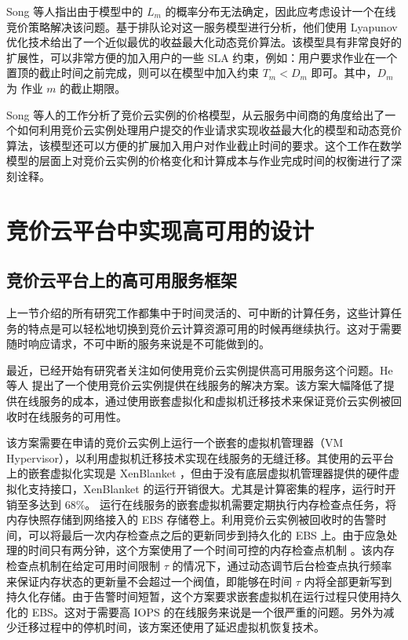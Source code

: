 Song 等人指出由于模型中的 $L_m$ 的概率分布无法确定，因此应考虑设计一个在线竞价策略解决该问题。基于排队论对这一服务模型进行分析，他们使用 Lyapunov 优化技术给出了一个近似最优的收益最大化动态竞价算法。该模型具有非常良好的扩展性，可以非常方便的加入用户的一些 SLA 约束，例如：用户要求作业在一个置顶的截止时间之前完成，则可以在模型中加入约束 $T_m < D_m$ 即可。其中，$D_m$ 为 作业 $m$ 的截止期限。

Song 等人的工作分析了竞价云实例的价格模型，从云服务中间商的角度给出了一个如何利用竞价云实例处理用户提交的作业请求实现收益最大化的模型和动态竞价算法，该模型还可以方便的扩展加入用户对作业截止时间的要求。这个工作在数学模型的层面上对竞价云实例的价格变化和计算成本与作业完成时间的权衡进行了深刻诠释。

\section{竞价云平台中实现高可用的设计}
\subsection{竞价云平台上的高可用服务框架}
上一节介绍的所有研究工作都集中于时间灵活的、可中断的计算任务，这些计算任务的特点是可以轻松地切换到竞价云计算资源可用的时候再继续执行。这对于需要随时响应请求，不可中断的服务来说是不可能做到的。

最近，已经开始有研究者关注如何使用竞价云实例提供高可用服务这个问题。He 等人 \cite{He:2015:CCH:2749246.2749275}  提出了一个使用竞价云实例提供在线服务的解决方案。该方案大幅降低了提供在线服务的成本，通过使用嵌套虚拟化和虚拟机迁移技术来保证竞价云实例被回收时在线服务的可用性。

该方案需要在申请的竞价云实例上运行一个嵌套的虚拟机管理器（VM Hypervisor），以利用虚拟机迁移技术实现在线服务的无缝迁移。其使用的云平台上的嵌套虚拟化实现是 XenBlanket \cite{Williams:2012:XVO:2168836.2168849}，但由于没有底层虚拟机管理器提供的硬件虚拟化支持接口，XenBlanket 的运行开销很大。尤其是计算密集的程序，运行时开销至多达到 68\%。 运行在线服务的嵌套虚拟机需要定期执行内存检查点任务，将内存快照存储到网络接入的 EBS 存储卷上。利用竞价云实例被回收时的告警时间，可以将最后一次内存检查点之后的更新同步到持久化的 EBS 上。由于应急处理的时间只有两分钟，这个方案使用了一个时间可控的内存检查点机制 \cite{Singh:2013:YEG:2482626.2482642}。该内存检查点机制在给定可用时间限制 $\tau$ 的情况下，通过动态调节后台检查点执行频率来保证内存状态的更新量不会超过一个阀值，即能够在时间 $\tau$ 内将全部更新写到持久化存储。由于告警时间短暂，这个方案要求嵌套虚拟机在运行过程只使用持久化的 EBS。这对于需要高 IOPS 的在线服务来说是一个很严重的问题。另外为减少迁移过程中的停机时间，该方案还使用了延迟虚拟机恢复技术。


